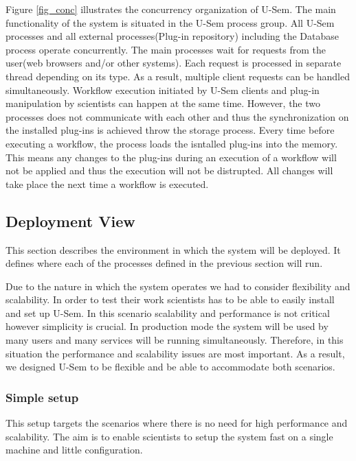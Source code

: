 Figure \ref{fig_conc} illustrates the concurrency organization of U-Sem. The main functionality of the system is situated in the U-Sem process group. All U-Sem processes and all external processes(Plug-in repository) including the Database process operate concurrently. The main processes wait for requests from the user(web browsers and/or other systems). Each request is processed in separate thread depending on its type. As a result, multiple client requests can be handled simultaneously. Workflow execution initiated by U-Sem clients and plug-in manipulation by scientists can happen at the same time. However, the two processes does not communicate with each other and thus the synchronization on the installed plug-ins is achieved throw the storage process. Every time before executing a workflow, the process loads the isntalled plug-ins into the memory. This means any changes to the plug-ins during an execution of a workflow will not be applied and thus the execution will not be distrupted. All changes will take place the next time a workflow is executed.

\subsection{Deployment View}

This section describes the environment in which the system will be deployed. It defines where each of the processes defined in the previous section will run. 

Due to the nature in which the system operates we had to consider flexibility and scalability. In order to test their work scientists has to be able to easily install and set up U-Sem. In this scenario scalability and performance is not critical however simplicity is crucial. In production mode the system will be used by many users and many services will be running simultaneously. Therefore, in this situation the performance and scalability issues are most important. As a result, we designed U-Sem to be flexible and be able to accommodate both scenarios.



\subsubsection{Simple setup}

This setup targets the scenarios where there is no need for high performance and scalability. The aim is to enable scientists to  setup the system fast on a single machine and little configuration. 


